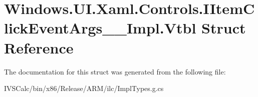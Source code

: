\hypertarget{struct_windows_1_1_u_i_1_1_xaml_1_1_controls_1_1_i_item_click_event_args_____impl_1_1_vtbl}{}\section{Windows.\+U\+I.\+Xaml.\+Controls.\+I\+Item\+Click\+Event\+Args\+\_\+\+\_\+\+Impl.\+Vtbl Struct Reference}
\label{struct_windows_1_1_u_i_1_1_xaml_1_1_controls_1_1_i_item_click_event_args_____impl_1_1_vtbl}


The documentation for this struct was generated from the following file\+:\begin{DoxyCompactItemize}
\item 
I\+V\+S\+Calc/bin/x86/\+Release/\+A\+R\+M/ilc/Impl\+Types.\+g.\+cs\end{DoxyCompactItemize}
